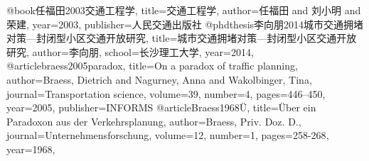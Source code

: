 @book{任福田2003交通工程学,
  title={交通工程学},
  author={任福田 and 刘小明 and 荣建},
  year={2003},
  publisher={人民交通出版社}
}
@phdthesis{李向朋2014城市交通拥堵对策—封闭型小区交通开放研究,
	title={城市交通拥堵对策—封闭型小区交通开放研究},
	author={李向朋},
	school={长沙理工大学},
	year={2014},
}
@article{braess2005paradox,
	title={On a paradox of traffic planning},
	author={Braess, Dietrich and Nagurney, Anna and Wakolbinger, Tina},
	journal={Transportation science},
	volume={39},
	number={4},
	pages={446--450},
	year={2005},
	publisher={INFORMS}
}
@article{Braess1968Ü,
	title={Über ein Paradoxon aus der Verkehrsplanung},
	author={Braess, Priv. Doz. D.},
	journal={Unternehmensforschung},
	volume={12},
	number={1},
	pages={258-268},
	year={1968},
}